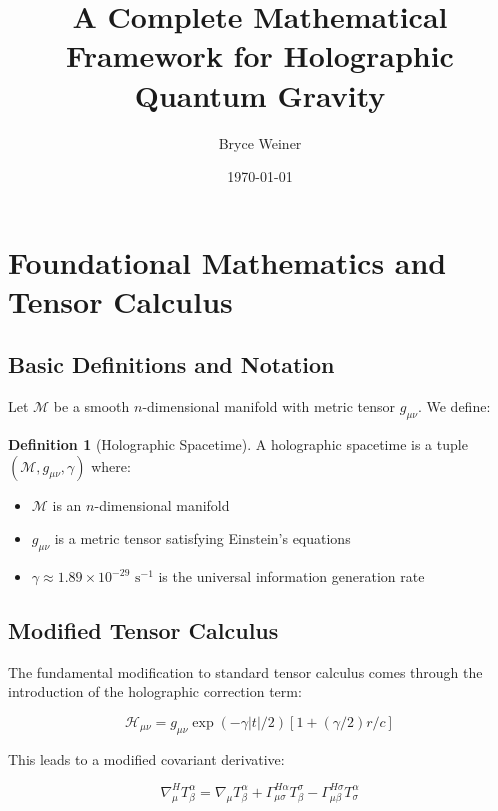\documentclass[12pt]{article}
\title{A Complete Mathematical Framework for Holographic Quantum Gravity}
\author{Bryce Weiner}
\date{\today}
\theoremstyle{plain}
\theoremstyle{definition}
\newtheorem{definition}[theorem]{Definition}
\theoremstyle{remark}
\begin{document}
\maketitle

\section{Foundational Mathematics and Tensor Calculus}

\subsection{Basic Definitions and Notation}

Let $\mathcal{M}$ be a smooth $n$-dimensional manifold with metric tensor $g_{\mu\nu}$. We define:

\begin{definition}[Holographic Spacetime]
A holographic spacetime is a tuple $(\mathcal{M}, g_{\mu\nu}, \gamma)$ where:
\begin{itemize}
\item $\mathcal{M}$ is an $n$-dimensional manifold
\item $g_{\mu\nu}$ is a metric tensor satisfying Einstein's equations
\item $\gamma \approx 1.89 \times 10^{-29} \text{ s}^{-1}$ is the universal information generation rate
\end{itemize}
\end{definition}

\subsection{Modified Tensor Calculus}

The fundamental modification to standard tensor calculus comes through the introduction of the holographic correction term:

\begin{equation}
\mathcal{H}_{\mu\nu} = g_{\mu\nu} \exp(-\gamma|t|/2)[1 + (\gamma/2)r/c]
\end{equation}

This leads to a modified covariant derivative:

\begin{equation}
\nabla^{H}_{\mu}T^{\alpha}_{\beta} = \nabla_{\mu}T^{\alpha}_{\beta} + \Gamma^{H\alpha}_{\mu\sigma}T^{\sigma}_{\beta} - \Gamma^{H\sigma}_{\mu\beta}T^{\alpha}_{\sigma}
\end{equation}
\end{document}
